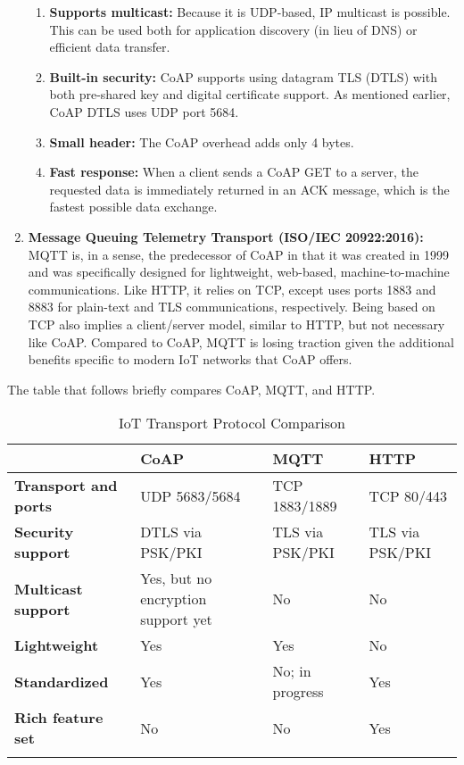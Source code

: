 \begin{enumerate}
  \begin{enumerate}
    \item \textbf{Supports multicast:} Because it is UDP-based, IP multicast
	is possible. This can be used both for application discovery (in lieu of DNS)
	or efficient data transfer.
    \item \textbf{Built-in security:} CoAP supports using datagram TLS (DTLS)
	with both pre-shared key and digital certificate support. As mentioned
	earlier, CoAP DTLS uses UDP port 5684.
    \item \textbf{Small header:} The CoAP overhead adds only 4 bytes.
    \item \textbf{Fast response:} When a client sends a CoAP GET to a server,
	the requested data is immediately returned in an ACK message, which is the
	fastest possible data exchange.
  \end{enumerate}

  \item \textbf{Message Queuing Telemetry Transport (ISO/IEC 20922:2016):}
  MQTT is, in a sense, the predecessor of CoAP in that it was created in 1999
  and was specifically designed for lightweight, web-based, machine-to-machine
  communications. Like HTTP, it relies on TCP, except uses ports 1883 and 8883
  for plain-text and TLS communications, respectively. Being based on TCP also
  implies a client/server model, similar to HTTP, but not necessary like CoAP.
  Compared to CoAP, MQTT is losing traction given the additional benefits
  specific to modern IoT networks that CoAP offers.
\end{enumerate}

The table that follows briefly compares CoAP, MQTT, and HTTP.

\begin{longtable}{llll}
\toprule
&
\textbf{CoAP}
&
\textbf{MQTT}
&
\textbf{HTTP}
\\ \midrule
\textbf{Transport and ports}
&
UDP 5683/5684
&
TCP 1883/1889
&
TCP 80/443
\\ \midrule
\textbf{Security support}
&
DTLS via PSK/PKI
&
TLS via PSK/PKI
&
TLS via PSK/PKI
\\ \midrule
\textbf{Multicast support}
&
Yes, but no encryption support yet
&
No
&
No
\\ \midrule
\textbf{Lightweight}
&
Yes
&
Yes
&
No
\\ \midrule
\textbf{Standardized}
&
Yes
&
No; in progress
&
Yes
\\ \midrule
\textbf{Rich feature set}
&
No
&
No
&
Yes
\\
\bottomrule
\caption{IoT Transport Protocol Comparison}
\end{longtable}

